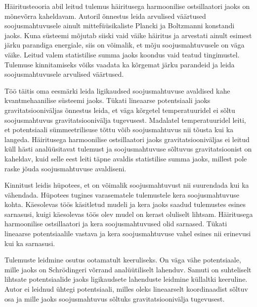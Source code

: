 \documentclass{trkut}%
\begin{document}
Häiritusteooria abil leitud tulemus häiritusega harmoonilise ostsillaatori jaoks on mõnevõrra kaheldavam.
Autoril õnnestus leida arvulised väärtused soojusmahtuvusele ainult mittefüüsikaliste Plancki ja Boltzmanni konstandi jaoks.
Kuna süsteemi mõjutab siiski vaid väike häiritus ja arvestati ainult esimest järku parandiga energiale, siis on võimalik, et mõju soojusmahtuvusele on väga väike.
Leitud valem statistilise summa jaoks koondus vaid teatud tingimustel.
Tulemuse kinnitamiseks võiks vaadata ka kõrgemat järku parandeid ja leida soojusmahtuvusele arvulised väärtused.



Töö täitis oma eesmärki leida ligikaudsed soojusmahtuvuse avaldised kahe kvantmehaanilise süsteemi jaoks.
Tükati lineaarse potentsiaali jaoks gravitatsiooniväljas õnnestus leida, et väga kõrgetel temperatuuridel ei sõltu soojusmahtuvus gravitatsioonivälja tugevusest.
Madalatel temperatuuridel leiti, et potentsiaali sümmeetrilisuse tõttu võib soojusmahtuvus nii tõusta kui ka langeda.
Häiritusega harmoonilise ostsillaatori jaoks gravitatsiooniväljas ei leitud küll hästi analüüsitavat tulemust ja soojusmahtuvuse sõltuvus gravitatsioonist on kaheldav, kuid selle eest leiti täpne avaldis statistilise summa jaoks, millest pole raske jõuda soojusmahtuvuse avaldiseni.

Kinnitust leidis hüpotees, et on võimalik soojusmahtuvust nii suurendada kui ka vähendada.
Hüpotees tugines varasematele tulemustele kera soojusmahtuvuse kohta.
Käesolevas töös käsitletud mudeli ja kera jaoks saadud tulemustes esines sarnasusi, kuigi käesolevas töös olev mudel on kerast oluliselt lihtsam.
Häiritusega harmoonilise ostsillaatori ja kera soojusmahtuvused olid sarnased.
Tükati lineaarse potentsiaalile vastava ja kera soojusmahtuvuse vahel esines nii erinevusi kui ka sarnasusi.

Tulemuste leidmine osutus ootamatult keeruliseks.
On väga vähe potentsiaale, mille jaoks on Schrödingeri võrrand analüütiliselt lahenduv.
Samuti on suhteliselt lihtsate potentsiaalide jaoks ligikaudsete lahenduste leidmine küllaltki keeruline.
Autor ei leidnud ühtegi potentsiaali, milles oleks lineaarselt koordinaadist sõltuv osa ja mille jaoks soojusmahtuvus sõltuks gravitatsioonivälja tugevusest.
\end{document}
